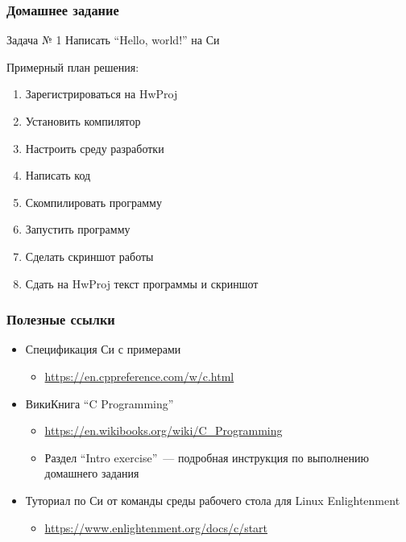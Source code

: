 \documentclass[aspectratio=169]{beamer}
\begin{document}
\begin{frame}
    \frametitle{Домашнее задание}

    \begin{block}{Задача № 1}
        Написать \enquote{Hello, world!} на Си
    \end{block}

    Примерный план решения:
    \begin{enumerate}
        \item Зарегистрироваться на HwProj
        \item Установить компилятор
        \item Настроить среду разработки
        \item Написать код
        \item Скомпилировать программу
        \item Запустить программу
        \item Сделать скриншот работы
        \item Сдать на HwProj текст программы и скриншот
    \end{enumerate}

\end{frame}

\begin{frame}
    \frametitle{Полезные ссылки}

    \begin{itemize}
        \item Спецификация Си с примерами
              \begin{itemize}
                  \item \url{https://en.cppreference.com/w/c.html}
              \end{itemize}
        \item ВикиКнига \enquote{C Programming}
              \begin{itemize}
                  \item \url{https://en.wikibooks.org/wiki/C_Programming}
                  \item Раздел \enquote{Intro exercise}~--- подробная инструкция по выполнению домашнего задания
              \end{itemize}
        \item Туториал по Си от команды среды рабочего стола для Linux Enlightenment
              \begin{itemize}
                  \item \url{https://www.enlightenment.org/docs/c/start}
              \end{itemize}
    \end{itemize}
\end{frame}
\end{document}
